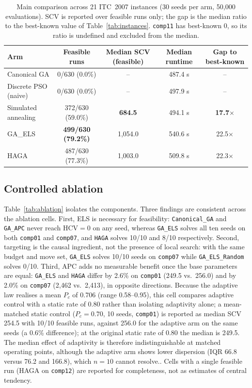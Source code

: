 \documentclass[journal]{IEEEtran}
\newcommand{\code}[1]{\texttt{#1}}
\begin{document}
\begin{table}[!t]
\caption{Main comparison across 21 ITC~2007 instances (30 seeds per arm, 50{,}000 evaluations). SCV is reported over feasible runs only; the gap is the median ratio to the best-known value of Table~\ref{tab:instances}. \code{comp11} has best-known $0$, so its ratio is undefined and excluded from the median.}
\label{tab:main}
\centering
\small
\begin{tabular}{l c c c c}
\toprule
Arm & Feasible runs & Median SCV (feasible) & Median runtime & Gap to best-known \\
\midrule
Canonical GA & 0/630 (0.0\%) & -- & 487.4 s & -- \\
Discrete PSO (naive)  & 0/630 (0.0\%) & -- & 497.9 s & -- \\
Simulated annealing   & 372/630 (59.0\%) & \textbf{684.5} & 494.1 s & \textbf{17.7}$\times$ \\
GA\_ELS               & \textbf{499/630 (79.2\%)} & 1{,}054.0 & 540.6 s & 22.5$\times$ \\
HAGA                  & 487/630 (77.3\%) & 1{,}003.0 & 509.8 s & 22.3$\times$ \\
\bottomrule
\end{tabular}
\end{table}

\subsection{Controlled ablation}
Table~\ref{tab:ablation} isolates the components. Three findings are consistent across the ablation cells. First, ELS is necessary for feasibility: \code{Canonical\_GA} and \code{GA\_APC} never reach $\mathrm{HCV}=0$ on any seed, whereas \code{GA\_ELS} solves all ten seeds on both \code{comp01} and \code{comp07}, and \code{HAGA} solves 10/10 and 8/10 respectively. Second, targeting is the causal ingredient, not the presence of local search: with the same budget and move set, \code{GA\_ELS} solves 10/10 seeds on \code{comp07} while \code{GA\_ELS\_Random} solves 0/10. Third, APC adds no measurable benefit once the base parameters are equal: \code{GA\_ELS} and \code{HAGA} differ by 2.6\% on \code{comp01} (249.5 vs.\ 256.0) and by 2.0\% on \code{comp07} (2{,}462 vs.\ 2{,}413), in opposite directions. Because the adaptive law realises a mean $P_c$ of 0.706 (range 0.58--0.95), this cell compares adaptive control with a static rate of 0.80 rather than isolating adaptivity alone; a mean-matched static control ($P_c=0.70$, 10 seeds, \code{comp01}) is reported as median SCV 254.5 with 10/10 feasible runs, against 256.0 for the adaptive arm on the same seeds (a 0.6\% difference); at the original static rate of 0.80 the median is 249.5. The median effect of adaptivity is therefore indistinguishable at matched operating points, although the adaptive arm shows lower dispersion (IQR 66.8 versus 76.2 and 166.8), which $n=10$ cannot resolve.. Cells with a single feasible run (HAGA on \code{comp12}) are reported for completeness, not as estimates of central tendency.
\end{document}
